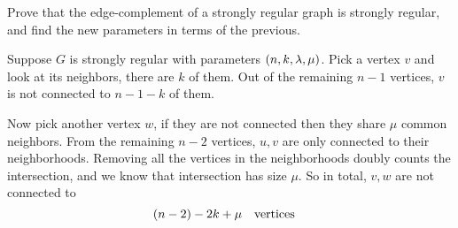 \documentclass[12pt]{memoir}
\begin{document}
\begin{Ej}[Exercise 6]
    Prove that the edge-complement of a strongly regular graph is strongly regular, and find the new parameters in terms of the previous.
\end{Ej}

\begin{ptcbr}
    Suppose $G$ is strongly regular with parameters $(n,k,\lambda,\mu)$. Pick a vertex $v$ and look at its neighbors, there are $k$ of them. Out of the remaining $n-1$ vertices, $v$ is not connected to $n-1-k$ of them.\par 
    Now pick another vertex $w$, if they are not connected then they share $\mu$ common neighbors. From the remaining $n-2$ vertices, $u,v$ are only connected to their neighborhoods. Removing all the vertices in the neighborhoods doubly counts the intersection, and we know that intersection has size $\mu$. So in total, $v,w$ are not connected to  
    $$(n-2)-2k+\mu\quad\text{vertices}\quad$$
\end{ptcbr}
\end{document}
